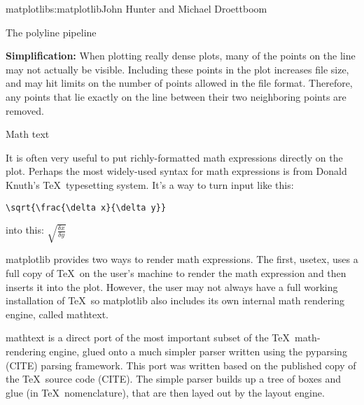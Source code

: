 \begin{aosachapter}{matplotlib}{s:matplotlib}{John Hunter and Michael Droettboom}
\begin{aosasect1}{The polyline pipeline}
\begin{aosaenumerate}
\item \textbf{Simplification:} When plotting really dense plots, many
  of the points on the line may not actually be visible.  Including
  these points in the plot increases file size, and may hit limits on
  the number of points allowed in the file format.  Therefore, any
  points that lie exactly on the line between their two neighboring
  points are removed.

\end{aosaenumerate}


\end{aosasect1}

\begin{aosasect1}{Math text}

It is often very useful to put richly-formatted math expressions
directly on the plot.  Perhaps the most widely-used syntax for math
expressions is from Donald Knuth's \TeX\ typesetting system.  It's a
way to turn input like this:
\begin{verbatim}
\sqrt{\frac{\delta x}{\delta y}}
\end{verbatim}
into this:
\begin{math}
\sqrt{\frac{\delta x}{\delta y}}
\end{math}

matplotlib provides two ways to render math expressions.  The first,
usetex, uses a full copy of \TeX\ on the user's machine to render the
math expression and then inserts it into the plot.  However, the user
may not always have a full working installation of \TeX\, so
matplotlib also includes its own internal math rendering engine,
called mathtext.

mathtext is a direct port of the most important subset of the
\TeX\ math-rendering engine, glued onto a much simpler parser written
using the pyparsing (CITE) parsing framework.  This port was written
based on the published copy of the \TeX\ source code (CITE).  The
simple parser builds up a tree of boxes and glue (in
\TeX\ nomenclature), that are then layed out by the layout engine.

\end{aosasect1}


\end{aosachapter}


